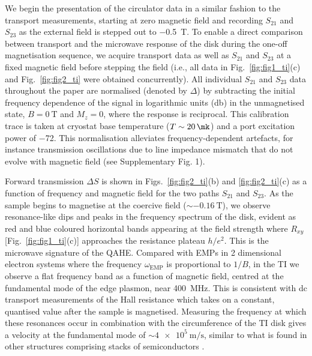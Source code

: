 We begin the presentation of the circulator data in a similar fashion to the transport measurements, starting at zero magnetic field and recording $S_{21}$ and $S_{23}$ as the external field is stepped out to \SI{-0.5}{\tesla}. To enable a direct comparison between transport and the microwave response of the disk during the one-off magnetisation sequence, we acquire transport data as well as $S_{21}$ and $S_{23}$ at a fixed magnetic field before stepping the field (i.e., all data in Fig.~\ref{fig:fig1_ti}(c) and Fig.~\ref{fig:fig2_ti} were obtained concurrently). All individual $S_{21}$ and $S_{23}$ data throughout the paper are normalised (denoted by $\Delta$) by subtracting the initial frequency dependence of the signal in logarithmic units (\si{\decibel}) in the unmagnetised state, $B = \SI{0}{\tesla}$ and $M_z = 0$, where the response is reciprocal. This calibration trace is taken at cryostat base temperature ($T \sim \SI{20}{\mk}$) and a port excitation power of \SI{-72}{\dBm}.  This normalisation alleviates frequency-dependent artefacts, for instance transmission oscillations due to line impedance mismatch that do not evolve with magnetic field (see Supplementary Fig. 1). 

Forward transmission $\Delta S$ is shown in Figs.~\ref{fig:fig2_ti}(b) and \ref{fig:fig2_ti}(c) as a function of frequency and magnetic field for the two paths $S_{21}$ and $S_{23}$. As the sample begins to magnetise at the coercive field ($\sim \SI{-0.16}{\tesla}$), we observe resonance-like dips and peaks in the frequency spectrum of the disk, evident as red and blue coloured horizontal bands appearing at the field strength where $R_{xy}$ [Fig.~\ref{fig:fig1_ti}(c)] approaches the resistance plateau $h/e^2$. This is the microwave signature of the QAHE. Compared with EMPs in 2 dimensional electron systems \cite{mahoney2016chip} where the frequency $\omega_{\mathrm{EMP}}$ is proportional to $1/B$, in the TI we observe a flat frequency band as a function of magnetic field, centred at  the fundamental mode of the edge plasmon, near \SI{400}{\mega\hertz}. This is consistent with dc transport measurements of the Hall resistance which takes on a constant, quantised value after the sample is magnetised. Measuring the frequency at which these resonances occur in combination with the circumference of the TI disk gives a velocity at the fundamental mode of $\sim \SI{4e5}{\meter\per\second}$, similar to what is found in other structures comprising stacks of semiconductors \cite{kamata2010voltage, kumada2011edge, mahoney2016chip}. 


